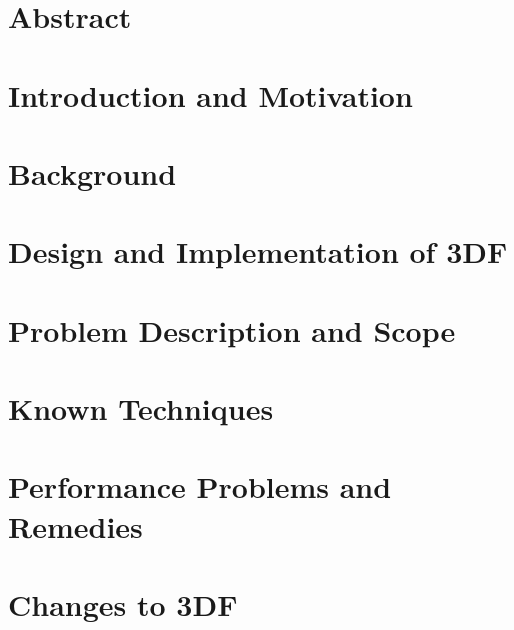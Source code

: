 \documentclass{article}
\begin{document}
\tableofcontents

\section{Abstract} \label{abstract}

\section{Introduction and Motivation} \label{intro}


\section{Background} \label{background}


\section{Design and Implementation of 3DF} \label{3df}


\section{Problem Description and Scope} \label{problem}


\section{Known Techniques} \label{known-techniques}


\section{Performance Problems and Remedies} \label{catalog}


\section{Changes to 3DF} \label{implementation}

\end{document}
